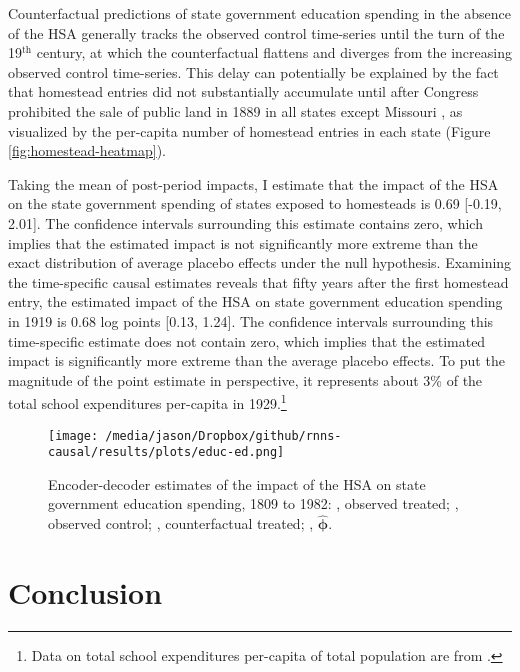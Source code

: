 \documentclass[hidelinks,12pt]{article}
\DeclareRobustCommand\sampleline[1]{%
	\tikz\draw[#1] (0,0) (0,\the\dimexpr\fontdimen22\textfont2\relax)
	-- (2em,\the\dimexpr\fontdimen22\textfont2\relax);%
}
\begin{document}
Counterfactual predictions of state government education spending in the absence of the HSA generally tracks the observed control time-series until the turn of the 19$^\text{th}$ century, at which the counterfactual flattens and diverges from the increasing observed control time-series. This delay can potentially be explained by the fact that homestead entries did not substantially accumulate until after Congress prohibited the sale of public land in 1889 in all states except Missouri \citep{gates1941land,gates1979federal}, as visualized by the per-capita number of homestead entries in each state (Figure \ref{fig:homestead-heatmap}). 

Taking the mean of post-period impacts, I estimate that the impact of the HSA on the state government spending of states exposed to homesteads is 0.69 [-0.19, 2.01]. The confidence intervals surrounding this estimate contains zero, which implies that the estimated impact is not significantly more extreme than the exact distribution of average placebo effects under the null hypothesis. Examining the time-specific causal estimates reveals that fifty years after the first homestead entry, the estimated impact of the HSA on state government education spending in 1919 is 0.68 log points [0.13, 1.24]. The confidence intervals surrounding this time-specific estimate does not contain zero, which implies that the estimated impact is significantly more extreme than the average placebo effects. To put the magnitude of the point estimate in perspective, it represents about 3\% of the total school expenditures per-capita in 1929.\footnote{Data on total school expenditures per-capita of total population are from \citet{snyder2010digest}.}
 
\begin{figure}[htbp]
	\centering
	\texttt{[image: /media/jason/Dropbox/github/rnns-causal/results/plots/educ-ed.png]}
	\caption{Encoder-decoder estimates of the impact of the HSA on state government education spending, 1809 to 1982:		{\color{Darjeeling15}{\sampleline{}}}, observed treated;
		{\color{Darjeeling11}{\sampleline{dashed}}}, observed control;
		{\color{Darjeeling15}{\sampleline{dotted}}}, counterfactual treated;
		{\color{Darjeeling15}{\sampleline{dash pattern=on .7em off .2em on .05em off .2em}}}, $\boldsymbol{\hat{\phi}}$.\label{educ-ed}} 
\end{figure}

\section{Conclusion} \label{conclusion}
\end{document}
